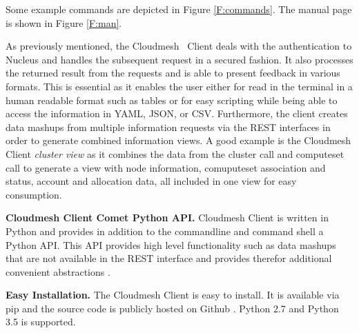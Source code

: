 Some example commands are depicted in Figure \ref{F:commands}. The
manual page is shown in Figure \ref{F:man}.



As previously mentioned, the Cloudmesh \Comet~Client deals with the
authentication to \Comet Nucleus and handles the subsequent request in
a secured fashion. It also processes the returned result from the
requests and is able to present feedback in various formats. This is
essential as it enables the user either for read in the terminal in a
human readable format such as tables or for easy scripting while being
able to access the information in YAML, JSON, or CSV. Furthermore, the
client creates data mashups from multiple information requests via the
REST interfaces in order to generate combined information views. A
good example is the Cloudmesh Client {\em cluster view} as it combines
the data from the cluster call and computeset call to generate a view
with node information, comuputeset association and status, account and
allocation data, all included in one view for easy consumption.

\parindent 0pt { \bf Cloudmesh Client Comet Python API.}
Cloudmesh Client is written in Python and provides in addition to the
commandline and command shell a Python API. This API provides high
level functionality such as data mashups that are not available in the
REST interface and provides therefor additional convenient
abstractions \cite{www-cloudmesh-client-github}.

\parindent 0pt { \bf Easy Installation.} The Cloudmesh Client is easy
to install. It is available via pip and the source code is publicly
hosted on Github \cite{www-cloudmesh-client-github}. Python 2.7
and Python 3.5 is supported.



 

%
%


